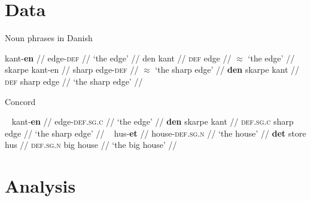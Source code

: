 \documentclass[aspectratio=149]{beamer}
\begin{document}
\section{Data}
\begin{frame}{Noun phrases in Danish  {\hfill\footnotesize\citep{hankamer2018structure}}} %
\begin{multicols}{2}
\pex
\a
\begingl
\gla kant-\textbf{en} //
\glb edge-\textsc{def} //
\glft `the edge' //
\endgl \label{ex:kanten}
\a \ljudge{*}
\begingl
\gla  den kant //
\glb \textsc{def} edge //
\glft $\approx$ `the edge' //
\endgl
\xe
\pex~
\a \ljudge{*}
\begingl
\gla skarpe kant-en //
\glb sharp edge-\textsc{def} //
\glft $\approx$ `the sharp edge' //
\endgl
\a
\begingl
\gla \textbf{den} skarpe kant //
\glb \textsc{def} sharp edge //
\glft `the sharp edge' //
\endgl \label{ex:den-skarpe-kant}
\xe
\end{multicols}
\end{frame}

%

\begin{frame}{Concord}
\begin{multicols}{2}
\pex~
\a
\begingl
\gla kant-\textbf{en} //
\glb edge-\textsc{def.sg.c} //
\glft `the edge' //
\endgl
\a
\begingl
\gla \textbf{den} skarpe kant //
\glb \textsc{def.sg.c} sharp edge //
\glft `the sharp edge' //
\endgl
\xe
\pex~
\a
\begingl
\gla hus-\textbf{et} //
\glb house-\textsc{def.sg.n} //
\glft `the house' //
\endgl \label{ex:huset}
\a
\begingl
\gla \textbf{det} store hus //
\glb \textsc{def.sg.n} big house //
\glft `the big house' //
\endgl \label{ex:det-store-hus}
\xe
\end{multicols}
\end{frame}

\section{Analysis}
\end{document}
